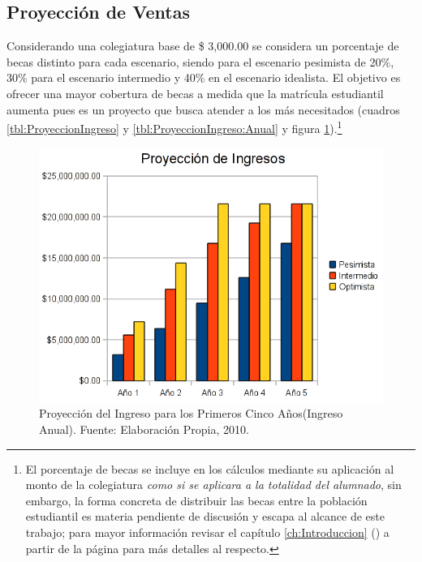 \subsection{Proyección de Ventas}

Considerando una colegiatura base de \$ 3,000.00 se considera un porcentaje de becas distinto para cada escenario, siendo para el escenario pesimista de 20\%, 30\% para el escenario intermedio y 40\% en el escenario idealista. El objetivo es ofrecer una mayor cobertura de becas a medida que la matrícula estudiantil aumenta pues es un proyecto que busca atender a los más necesitados (cuadros \ref{tbl:ProyeccionIngreso} y \ref{tbl:ProyeccionIngreso:Anual} y figura \ref{fig:ProyeccionIngresos}).\footnote{El porcentaje de becas se incluye en los cálculos mediante su aplicación al monto de la colegiatura \emph{como si se aplicara a la totalidad del alumnado}, sin embargo, la forma concreta de distribuir las becas entre la población estudiantil es materia pendiente de discusión y escapa al alcance de este trabajo; para mayor información revisar el capítulo \ref{ch:Introduccion} () a partir de la página \pageref{ch:Introduccion} para más detalles al respecto.}





\begin{figure}
	\centering
	\includegraphics[scale=0.7]{images/proyeccion_ingresos}
	\caption{Proyecci\'on del Ingreso para los Primeros Cinco Años\newline (Ingreso Anual). Fuente: Elaboración Propia, 2010.}
	\label{fig:ProyeccionIngresos}
\end{figure}

